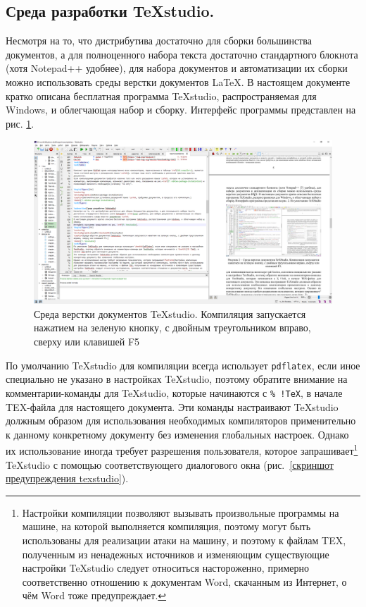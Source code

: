\documentclass[report, draught]{fefudoc}
\begin{document}
\subsection{Среда разработки TeXstudio.}
Несмотря на то, что дистрибутива достаточно для сборки большинства документов, а для полноценного набора текста достаточно стандартного блокнота (хотя Notepad++ \cite{npp} удобнее), для набора документов и автоматизации их сборки можно использовать среды верстки документов \LaTeX.
В настоящем документе кратко описана бесплатная программа TeXstudio, распространяемая для Windows, и облегчающая набор и сборку.
Интерфейс программы представлен на рис. \ref{скриншот texstudio}.
\begin{figure}
\centering
\includegraphics[width=\textwidth]{workbook-extras/texstudio}
\caption{Среда верстки документов TeXstudio. Компиляция запускается нажатием на зеленую кнопку, с двойным треугольником вправо, сверху или клавишей F5}
\label{скриншот texstudio}
\end{figure}
По умолчанию TeXstudio для компиляции всегда использует \texttt{pdflatex}, если иное специально не указано в настройках TeXstudio, поэтому обратите внимание на комментарии-команды для TeXstudio, которые начинаются с \texttt{\% !TeX}, в начале TEX-файла для настоящего документа.
Эти команды настраивают TeXstudio должным образом для использования необходимых компиляторов применительно к данному конкретному документу без изменения глобальных настроек.
Однако их использование иногда требует разрешения пользователя, которое запрашивает\footnote{Настройки компиляции позволяют вызывать произвольные программы на машине, на которой выполняется компиляция, поэтому могут быть использованы для реализации атаки на машину, и поэтому к файлам TEX, полученным из ненадежных источников и изменяющим существующие настройки TeXstudio следует относиться настороженно, примерно соответственно отношению к документам Word, скачанным из Интернет, о чём Word тоже предупреждает.} TeXstudio с помощью соответствующего диалогового окна (рис.~\ref{скриншот предупреждения texstudio}).
\end{document}
